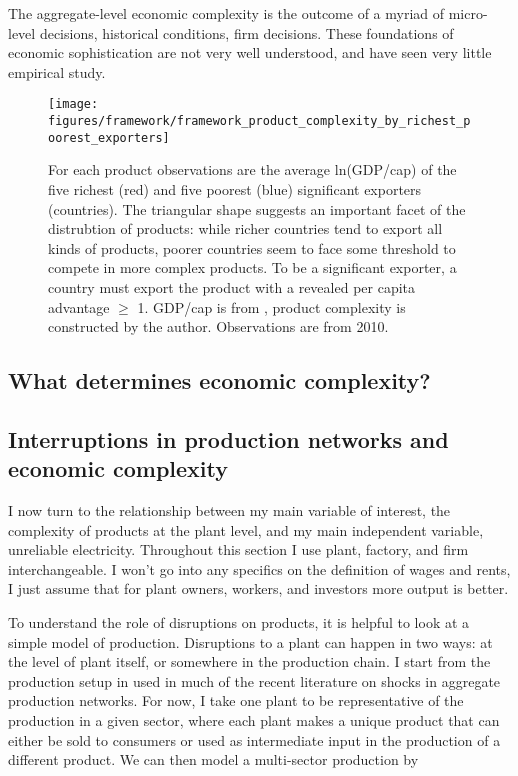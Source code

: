 \documentclass[11pt]{article}
\begin{document}
The aggregate-level economic complexity is the outcome of a myriad of micro-level decisions, historical conditions, firm decisions. These foundations of economic sophistication are not very well understood, and have seen very little empirical study.

\begin{figure}[htpb]
	\centering
	\texttt{[image: figures/framework/framework\_product\_complexity\_by\_richest\_poorest\_exporters]}
	\caption{For each product observations are the average ln(GDP/cap) of the five richest (red) and five poorest (blue) significant exporters (countries). The triangular shape suggests an important facet of the distrubtion of products: while richer countries tend to export all kinds of products, poorer countries seem to face some threshold to compete in more complex products. To be a significant exporter, a country must export the product with a revealed per capita advantage \(\geq\) 1. GDP/cap is from \cite{world_bank_world_2020-1}, product complexity is constructed by the author. Observations are from 2010.}%
	\label{fig:framework-least-most}
\end{figure}

\subsection{What determines economic complexity?}
\label{sec:frame-determines-complexity}

\subsection{Interruptions in production networks and economic complexity}
\label{sec:production_networks}
I now turn to the relationship between my main variable of interest, the complexity of products at the plant level, and my main independent variable, unreliable electricity. Throughout this section I use plant, factory, and firm interchangeable. I won't go into any specifics on the definition of wages and rents, I just assume that for plant owners, workers, and investors more output is better.

To understand the role of disruptions on products, it is helpful to look at a simple model of production. Disruptions to a plant can happen in two ways: at the level of plant itself, or somewhere in the production chain. I start from the production setup in \cite{acemoglu_network_2012} used in much of the recent literature on shocks in aggregate production networks. For now, I take one plant to be representative of the production in a given sector, where each plant makes a unique product that can either be sold to consumers or used as intermediate input in the production of a different product. We can then model a multi-sector production by
\end{document}
